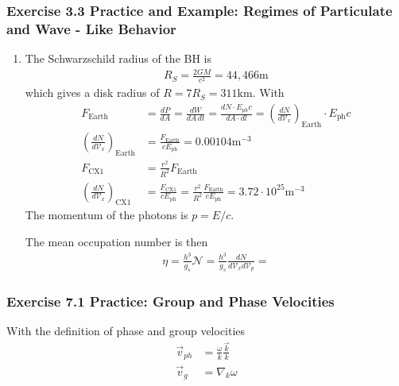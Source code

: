 \documentclass[10pt,a4paper]{book}
\theoremstyle{definition}
\begin{document}
\subsubsection{Exercise 3.3 Practice and Example: Regimes of Particulate and Wave - Like Behavior}
\begin{enumerate}[label=(\alph*)]
\item The Schwarzschild radius of the BH is
\begin{align}
    R_S=\frac{2GM}{c^2}=44,466\text{m}
\end{align}
which gives a disk radius of $R=7R_S=311\text{km}$.
With
\begin{align}
    F_\text{Earth}&=\frac{dP}{dA}=\frac{dW}{dA\,dt}=\frac{dN\cdot E_{ph} c}{dA\cdot
    dl}=\left(\frac{dN}{d\mathcal{V}_x}\right)_\text{Earth}\cdot E_\text{ph} c\\
    \left(\frac{dN}{d\mathcal{V}_x}\right)_\text{Earth}&=\frac{F_\text{Earth}}{cE_\text{ph}}=0.00104\text{m}^{-3}\\
    F_\text{CX1}&=\frac{r^2}{R^2}F_\text{Earth}\\
    \left(\frac{dN}{d\mathcal{V}_x}\right)_\text{CX1}&=\frac{F_\text{CX1}}{cE_\text{ph}}=\frac{r^2}{R^2}\frac{F_\text{Earth}}{cE_\text{ph}}=3.72\cdot10^{25}\text{m}^{-3}
\end{align}
The momentum of the photons is $p=E/c$.

The mean occupation number is then
\begin{align}
    \eta=\frac{h^3}{g_s}\mathcal{N}=\frac{h^3}{g_s}\frac{dN}{d\mathcal{V}_xd\mathcal{V}_p}=
\end{align}
\end{enumerate}


\subsubsection{Exercise 7.1 Practice: Group and Phase Velocities}
With the definition of phase and group velocities
\begin{align}
    \vec{v}_{ph}&=\frac{\omega}{k}\frac{\vec{k}}{k}\\
    \vec{v}_{g}&=\nabla_k{\omega}
\end{align}
\end{document}
